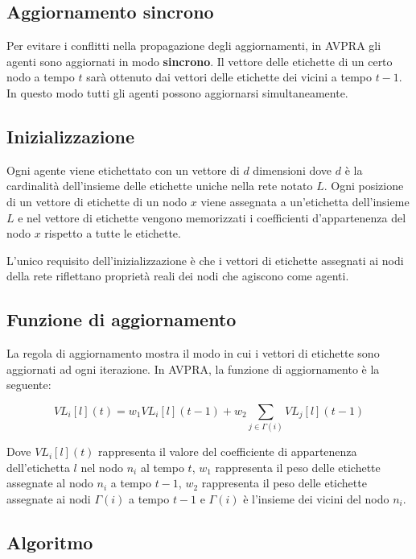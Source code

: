 \documentclass[a4paper,12pt]{report}
\begin{document}
		\subsection{Aggiornamento sincrono}
		Per evitare i conflitti nella propagazione degli aggiornamenti, in AVPRA gli agenti sono aggiornati in modo \textbf{sincrono}. Il vettore delle etichette di un certo nodo a tempo $t$ sarà ottenuto dai vettori delle etichette dei vicini a tempo $t-1$. In questo modo tutti gli agenti possono aggiornarsi simultaneamente. \cite{avpra}
	
		\subsection{Inizializzazione}
		Ogni agente viene etichettato con un vettore di $d$ dimensioni dove $d$ è la cardinalità dell'insieme delle etichette uniche nella rete notato $L$. Ogni posizione di un vettore di etichette di un nodo $x$ viene assegnata a un'etichetta dell'insieme $L$ e nel vettore di etichette vengono memorizzati i coefficienti d'appartenenza del nodo $x$ rispetto a tutte le etichette. 
		
		L'unico requisito dell'inizializzazione è che i vettori di etichette assegnati ai nodi della rete riflettano proprietà reali dei nodi che agiscono come agenti. \cite{avpra}

		\subsection{Funzione di aggiornamento}
		La regola di aggiornamento mostra il modo in cui i vettori di etichette sono aggiornati ad ogni iterazione. In AVPRA, la funzione di aggiornamento è la seguente:
		
		\begin{equation}
		VL_i [l] (t) = w_1 VL_i [l] (t-1) + w_2 \sum_{j \in \Gamma(i)} VL_j [l](t-1)
		\end{equation}

		Dove $VL_i[l](t)$ rappresenta il valore del coefficiente di appartenenza dell'etichetta $l$ nel nodo $n_i$ al tempo $t$, $w_1$ rappresenta il peso delle etichette assegnate al nodo $n_i$ a tempo $t - 1$, $w_2$ rappresenta il peso delle etichette assegnate ai nodi $\Gamma(i)$ a tempo $t - 1$ e $\Gamma(i)$ è l'insieme dei vicini del nodo $n_i$. \cite{avpra}

		\subsection{Algoritmo}
		
\end{document}
